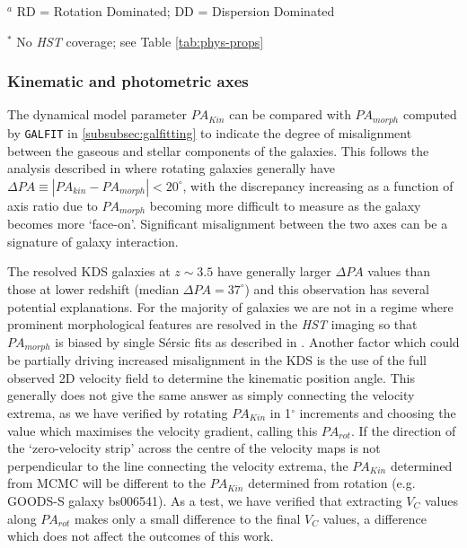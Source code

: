 \documentclass[fleqn,usenatbib]{mn2e}
\newcommand{\Sers}{S\'{e}rsic }
\begin{document}
\begin{table*}
\begin{threeparttable}
\begin{tabular}{cccccccc}
\end{tabular}
\begin{tablenotes}
      \small
      \item $^{a}$ RD = Rotation Dominated; DD = Dispersion Dominated
      \item $^{*}$ No {\em HST} coverage; see Table \ref{tab:phys-props}
    \end{tablenotes}
  \end{threeparttable}
  \end{table*}

\subsubsection{Kinematic and photometric axes}\label{subsubsection:kin_and_phot}

The dynamical model parameter $PA_{Kin}$ can be compared with $PA_{morph}$ computed by {\tt GALFIT} in \cref{subsubsec:galfitting} to indicate the degree of misalignment between the gaseous and stellar components of the galaxies.
This follows the analysis described in \citep[e.g.][]{Epinat2008,Epinat2012,Barrera-Ballesteros2014,Barrera-Ballesteros2015,Wisnioski2015,Harrison2017,Swinbank2017} where rotating galaxies generally have $\Delta PA \equiv |PA_{kin}-PA_{morph}| < 20^{\circ}$, with the discrepancy increasing as a function of axis ratio due to $PA_{morph}$ becoming more difficult to measure as the galaxy becomes more `face-on'.
Significant misalignment between the two axes can be a signature of galaxy interaction.

The resolved KDS galaxies at $z \sim 3.5$ have generally larger $\Delta PA$ values than those at lower redshift (median $\Delta PA = 37^{\circ}$) and this observation has several potential explanations.
For the majority of galaxies we are not in a regime where prominent morphological features are resolved in the {\em HST} imaging so that $PA_{morph}$ is biased by single \Sers fits as described in \cite{Rodrigues2016}.
Another factor which could be partially driving increased misalignment in the KDS is the use of the full observed 2D velocity field to determine the kinematic position angle.
This generally does not give the same answer as simply connecting the velocity extrema, as we have verified by rotating $PA_{Kin}$ in 1$^{\circ}$ increments and choosing the value which maximises the velocity gradient, calling this $PA_{rot}$.
If the direction of the `zero-velocity strip' across the centre of the velocity maps is not perpendicular to the line connecting the velocity extrema, the $PA_{Kin}$ determined from MCMC will be different to the $PA_{Kin}$ determined from rotation (e.g. GOODS-S galaxy bs006541).
As a test, we have verified that extracting $V_{C}$ values along $PA_{rot}$ makes only a small difference to the final $V_{C}$ values, a difference which does not affect the outcomes of this work.
\end{document}
